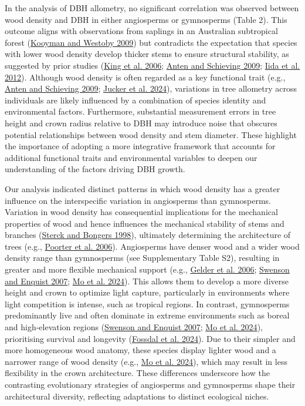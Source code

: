 \documentclass[
  12pt,
  letterpaper,
  DIV=11,
  numbers=noendperiod]{scrartcl}
\begin{document}
In the analysis of DBH allometry, no significant correlation was
observed between wood density and DBH in either angiosperms or
gymnosperms (Table 2). This outcome aligns with observations from
saplings in an Australian subtropical forest
(\protect\hyperlink{ref-Kooyman2009}{Kooyman and Westoby 2009}) but
contradicts the expectation that species with lower wood density develop
thicker stems to ensure structural stability, as suggested by prior
studies (\protect\hyperlink{ref-King2006}{King et al. 2006};
\protect\hyperlink{ref-Anten2009}{Anten and Schieving 2009};
\protect\hyperlink{ref-Iida2012}{Iida et al. 2012}). Although wood
density is often regarded as a key functional trait (e.g.,
\protect\hyperlink{ref-Anten2009}{Anten and Schieving 2009};
\protect\hyperlink{ref-Jucker2024}{Jucker et al. 2024}), variations in
tree allometry across individuals are likely influenced by a combination
of species identity and environmental factors. Furthermore, substantial
measurement errors in tree height and crown radius relative to DBH may
introduce noise that obscures potential relationships between wood
density and stem diameter. These highlight the importance of adopting a
more integrative framework that accounts for additional functional
traits and environmental variables to deepen our understanding of the
factors driving DBH growth.

Our analysis indicated distinct patterns in which wood density has a
greater influence on the interspecific variation in angiosperms than
gymnosperms. Variation in wood density has consequential implications
for the mechanical properties of wood and hence influences the
mechanical stability of stems and branches
(\protect\hyperlink{ref-Sterck1998}{Sterck and Bongers 1998}),
ultimately determining the architecture of trees (e.g.,
\protect\hyperlink{ref-Poorter2006}{Poorter et al. 2006}). Angiosperms
have denser wood and a wider wood density range than gymnosperms (see
Supplementary Table S2), resulting in greater and more flexible
mechanical support (e.g., \protect\hyperlink{ref-Gelder2006}{Gelder et
al. 2006}; \protect\hyperlink{ref-Swenson2007}{Swenson and Enquist
2007}; \protect\hyperlink{ref-Mo2024}{Mo et al. 2024}). This allows them
to develop a more diverse height and crown to optimize light capture,
particularly in environments where light competition is intense, such as
tropical regions. In contrast, gymnosperms predominantly live and often
dominate in extreme environments such as boreal and high-elevation
regions (\protect\hyperlink{ref-Swenson2007}{Swenson and Enquist 2007};
\protect\hyperlink{ref-Mo2024}{Mo et al. 2024}), prioritising survival
and longevity (\protect\hyperlink{ref-Fossdal2024}{Fossdal et al.
2024}). Due to their simpler and more homogeneous wood anatomy, these
species display lighter wood and a narrower range of wood density (e.g.,
\protect\hyperlink{ref-Mo2024}{Mo et al. 2024}), which may result in
less flexibility in the crown architecture. These differences underscore
how the contrasting evolutionary strategies of angiosperms and
gymnosperms shape their architectural diversity, reflecting adaptations
to distinct ecological niches.
\end{document}
